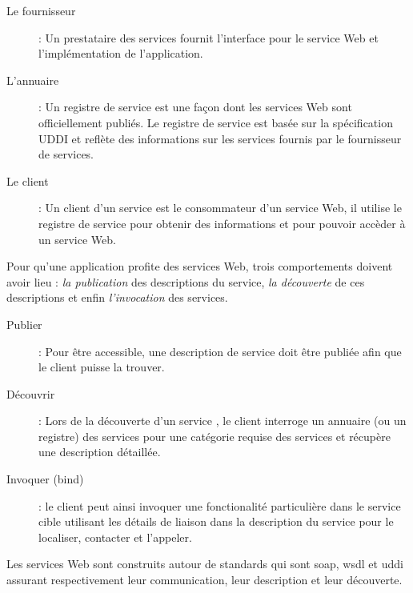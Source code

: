 

\renewcommand{\descriptionlabel}[1]{\hspace{1cm}\textbullet~\textsf{#1}}
\begin{description}
\item[Le fournisseur]: Un prestataire des services fournit l'interface
  pour le service Web et l'implémentation de l'application.

\item[L'annuaire]: Un registre de service est une façon dont les
  services Web sont officiellement publiés. Le registre de service est
  basée sur la spécification \textsc{UDDI} et reflète des informations
  sur les services fournis par le fournisseur de services.

\item[Le client]: Un client d'un service est le consommateur d'un
  service Web, il utilise le registre de service pour obtenir des
  informations et pour pouvoir accèder à un service Web.
\end{description}

Pour qu'une application profite des services Web, trois comportements
doivent avoir lieu : \textit{la publication} des descriptions du
service, \textit{la découverte} de ces descriptions et enfin
\textit{l'invocation} des services.

\renewcommand{\descriptionlabel}[1]{\hspace{1cm}\textbullet~\textsf{#1}}
\begin{description}
\item[Publier]: Pour être accessible, une description de service doit
  être publiée afin que le client puisse la trouver.

\item[Découvrir]: Lors de la découverte d'un service , le client
  interroge un annuaire (ou un registre) des services pour une
  catégorie requise des services et récupère une description
  détaillée.

\item[Invoquer (bind)]: le client peut ainsi invoquer une
  fonctionalité particulière dans le service cible utilisant les
  détails de liaison dans la description du service pour le localiser,
  contacter et l'appeler.
\end{description}

Les services Web sont construits autour de standards qui sont
\acrshort{soap}, \acrshort{wsdl} et \acrshort{uddi} assurant
respectivement leur communication, leur description et leur
découverte.

